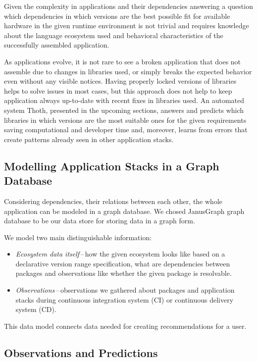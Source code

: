 \documentclass[a4paper]{llncs}
\begin{document}
Given the complexity in applications and their dependencies answering a question which dependencies in which versions are the best possible fit for a\-vaila\-ble hardware in the given runtime environment is not trivial and requires knowledge about the language ecosystem used and behavioral characteristics of the successfully assembled application.

As applications evolve, it is not rare to see a broken application that does not assemble due to changes in libraries used, or simply breaks the expected behavior even without any visible notices. Having properly locked versions of libraries helps to solve issues in most cases, but this approach does not help to keep application always up-to-date with recent fixes in libraries used. An automated system Thoth, presented in the upcoming sections, answers and predicts which libraries in which versions are the most suitable ones for the given requirements saving computational and developer time and, moreover, learns from errors that create patterns already seen in other application stacks.

\subsection{Modelling Application Stacks in a Graph Database} \label{section_modelling_app_stacks}

Considering dependencies, their relations between each other, the whole application can be modeled in a graph database. We chosed JanusGraph graph database to be our data store for storing data in a graph form.

We model two main distinguishable information:

\begin{itemize}
  \item \emph{Ecosystem data itself}\,--\,how the given ecosystem looks like based on a declarative version range specification, what are dependencies between packages and observations like whether the given package is resolvable.
  \item \emph{Observations}\,--\,observations we gathered about packages and application stacks during continuous integration system (CI) or continuous delivery system (CD).
\end{itemize}

This data model connects data needed for creating recommendations for a user.

\subsection{Observations and Predictions}
\end{document}
